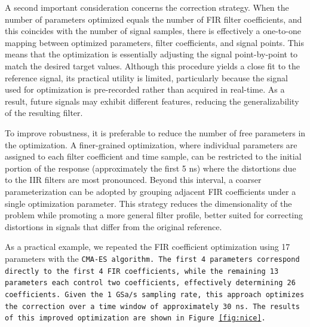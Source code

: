 A second important consideration concerns the correction strategy. 
When the number of parameters optimized equals the number of FIR filter coefficients, and this coincides with the number of signal samples, there is effectively a one-to-one mapping between optimized parameters, filter coefficients, and signal points. 
This means that the optimization is essentially adjusting the signal point-by-point to match the desired target values. 
Although this procedure yields a close fit to the reference signal, its practical utility is limited, particularly because the signal used for optimization is pre-recorded rather than acquired in real-time. 
As a result, future signals may exhibit different features, reducing the generalizability of the resulting filter.

To improve robustness, it is preferable to reduce the number of free parameters in the optimization.
A finer-grained optimization, where individual parameters are assigned to each filter coefficient and time sample, can be restricted to the initial portion of the response (approximately the first 5 ns) where the distortions due to the IIR filters are most pronounced.
Beyond this interval, a coarser parameterization can be adopted by grouping adjacent FIR coefficients under a single optimization parameter.
This strategy reduces the dimensionality of the problem while promoting a more general filter profile, better suited for correcting distortions in signals that differ from the original reference.

As a practical example, we repeated the FIR coefficient optimization using 17 parameters with the \tt{CMA-ES} algorithm. 
The first 4 parameters correspond directly to the first 4 FIR coefficients, while the remaining 13 parameters each control two coefficients, effectively determining 26 coefficients. 
Given the 1 GSa/s sampling rate, this approach optimizes the correction over a time window of approximately 30 ns. 
The results of this improved optimization are shown in Figure \ref{fig:nice}.

